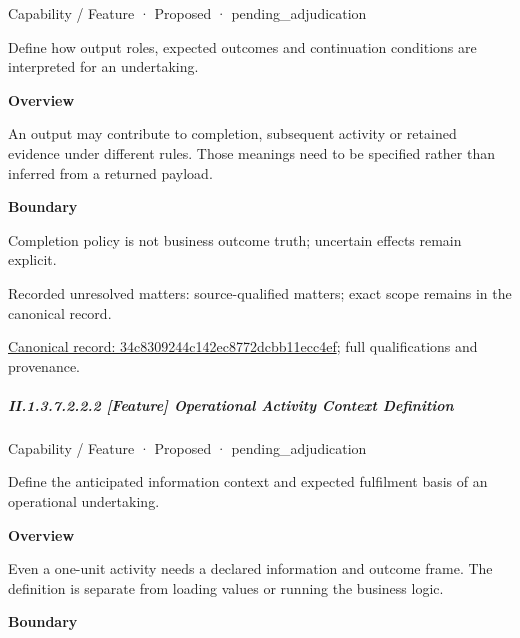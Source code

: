 \label{element:34c8309244c142ec8772dcbb11ecc4ef}
{\small Capability / Feature · Proposed · pending\_adjudication}\par

Define how output roles, expected outcomes and continuation conditions are interpreted for an undertaking.



\textbf{Overview}



An output may contribute to completion, subsequent activity or retained evidence under different rules. Those meanings need to be specified rather than inferred from a returned payload.



\textbf{Boundary}



Completion policy is not business outcome truth; uncertain effects remain explicit.


{\small Recorded unresolved matters: source-qualified matters; exact scope remains in the canonical record.}\par
{\footnotesize \href{../../../../continuum/strategy/capability/feature/34c8309244c142ec8772dcbb11ecc4ef.md}{Canonical record: 34c8309244c142ec8772dcbb11ecc4ef}; full qualifications and provenance.}\par
\subparagraph*{II.1.3.7.2.2.2 [Feature] Operational Activity Context Definition}
\label{navigation:II.1.3.7.2.2.2}

\label{element:58dcd59389664b7d83d14b536d7d03d0}
{\small Capability / Feature · Proposed · pending\_adjudication}\par

Define the anticipated information context and expected fulfilment basis of an operational undertaking.



\textbf{Overview}



Even a one-unit activity needs a declared information and outcome frame. The definition is separate from loading values or running the business logic.



\textbf{Boundary}



